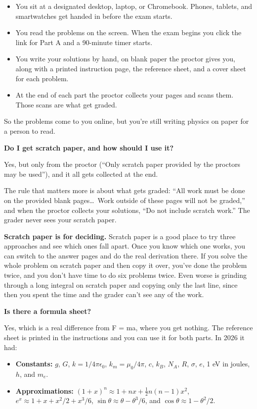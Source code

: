 \documentclass[11pt]{article}
\newcommand{\Q}[1]{\par\medskip\noindent\textbf{\color{qblue}#1}\par\nobreak\vspace{1pt}\nobreak}
\begin{document}
\begin{itemize}\setlength{\itemsep}{2pt}
\item You sit at a designated desktop, laptop, or Chromebook. Phones, tablets, and
smartwatches get handed in before the exam starts.
\item You read the problems on the screen. When the exam begins you click the link for
Part A and a 90-minute timer starts.
\item You write your solutions by hand, on blank paper the proctor gives you, along with a
printed instruction page, the reference sheet, and a cover sheet for each problem.
\item At the end of each part the proctor collects your pages and scans them. Those scans
are what get graded.
\end{itemize}

So the problems come to you online, but you're still writing physics on paper for a person
to read.

\Q{Do I get scratch paper, and how should I use it?}
Yes, but only from the proctor (``Only scratch paper provided by the proctors may be
used''), and it all gets collected at the end.

The rule that matters more is about what gets graded: ``All work must be done on the
provided blank pages\ldots\ Work outside of these pages will not be graded,'' and when the
proctor collects your solutions, ``Do not include scratch work.'' The grader never sees your
scratch paper.

\begin{tipbox}
\textbf{Scratch paper is for deciding.} Scratch paper is a good place to try three
approaches and see which ones fall apart. Once you know which one works, you can switch to
the answer pages and do the real derivation there. If you solve the whole problem on scratch
paper and then copy it over, you've done the problem twice, and you don't have time to do
six problems twice. Even worse is grinding through a long integral on scratch paper and
copying only the last line, since then you spent the time and the grader can't see any of
the work.
\end{tipbox}

\Q{Is there a formula sheet?}
Yes, which is a real difference from F = ma, where you get nothing. The reference sheet is
printed in the instructions and you can use it for both parts. In 2026 it had:

\begin{itemize}\setlength{\itemsep}{1pt}
\item \textbf{Constants:} $g$, $G$, $k = 1/4\pi\epsilon_0$, $k_m = \mu_0/4\pi$, $c$, $k_B$,
$N_A$, $R$, $\sigma$, $e$, 1 eV in joules, $h$, and $m_e$.
\item \textbf{Approximations:} $(1+x)^n \approx 1 + nx + \tfrac{1}{2}n(n-1)x^2$,
$e^x \approx 1 + x + x^2/2 + x^3/6$, $\sin\theta \approx \theta - \theta^3/6$, and
$\cos\theta \approx 1 - \theta^2/2$.
\end{itemize}
\end{document}
